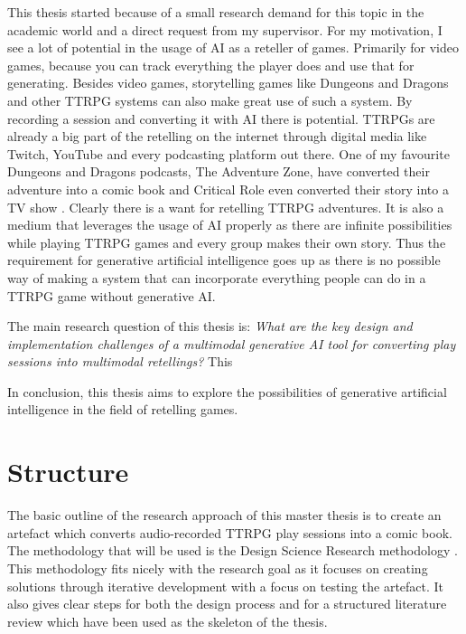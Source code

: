 This thesis started because of a small research demand for this topic in the academic world \cite{Gallotta2024LLM} and a direct request from my supervisor. For my motivation, I see a lot of potential in the usage of AI as a reteller of games. Primarily for video games, because you can track everything the player does and use that for generating. Besides video games, storytelling games like Dungeons and Dragons \cite{DnD5e} and other TTRPG systems can also make great use of such a system. By recording a session and converting it with AI there is potential. TTRPGs are already a big part of the retelling on the internet through digital media like Twitch, YouTube and every podcasting platform out there. One of my favourite Dungeons and Dragons podcasts, The Adventure Zone, have converted their adventure into a comic book \cite{AdventureZone2018} and Critical Role even converted their story into a TV show \cite{CRFOX}. Clearly there is a want for retelling TTRPG adventures. It is also a medium that leverages the usage of AI properly as there are infinite possibilities while playing TTRPG games and every group makes their own story. Thus the requirement for generative artificial intelligence goes up as there is no possible way of making a system that can incorporate everything people can do in a TTRPG game without generative AI.


The main research question of this thesis is: \textit{What are the key design and implementation challenges of a multimodal generative AI tool for converting play sessions into multimodal retellings?} This 

In conclusion, this thesis aims to explore the possibilities of generative artificial intelligence in the field of retelling games.

\section{Structure} 

The basic outline of the research approach of this master thesis is to create an artefact which converts audio-recorded TTRPG play sessions into a comic book. The methodology that will be used is the Design Science Research methodology \cite{dresch2015design}. This methodology fits nicely with the research goal as it focuses on creating solutions through iterative development with a focus on testing the artefact. It also gives clear steps for both the design process and for a structured literature review which have been used as the skeleton of the thesis.

